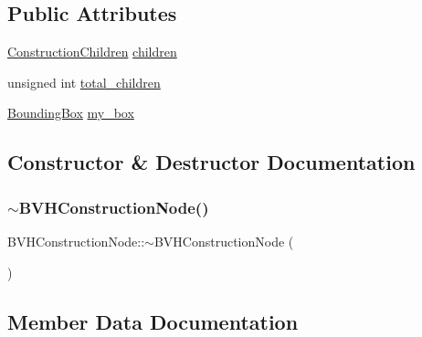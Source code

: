 \subsection*{Public Attributes}
\begin{DoxyCompactItemize}
\item 
\mbox{\hyperlink{unionBVHConstructionNode_1_1ConstructionChildren}{Construction\+Children}} \mbox{\hyperlink{structBVHConstructionNode_a28b66929c4c6a7744f5cac8859378cf5}{children}}
\item 
unsigned int \mbox{\hyperlink{structBVHConstructionNode_a368f81cc16c426723f52ae5375362d54}{total\+\_\+children}}
\item 
\mbox{\hyperlink{classBoundingBox}{Bounding\+Box}} \mbox{\hyperlink{structBVHConstructionNode_a7b016f9b43b10a37c6bbb546d8289c3e}{my\+\_\+box}}
\end{DoxyCompactItemize}


\subsection{Constructor \& Destructor Documentation}
\mbox{\label{structBVHConstructionNode_af28961a656f19c0a72ad44c69db2b01d}} 
\subsubsection{\texorpdfstring{$\sim$BVHConstructionNode()}{~BVHConstructionNode()}}
{\footnotesize\ttfamily B\+V\+H\+Construction\+Node\+::$\sim$\+B\+V\+H\+Construction\+Node (\begin{DoxyParamCaption}{ }\end{DoxyParamCaption})\hspace{0.3cm}{\ttfamily [inline]}}



\subsection{Member Data Documentation}
\mbox{\label{structBVHConstructionNode_a28b66929c4c6a7744f5cac8859378cf5}} 

